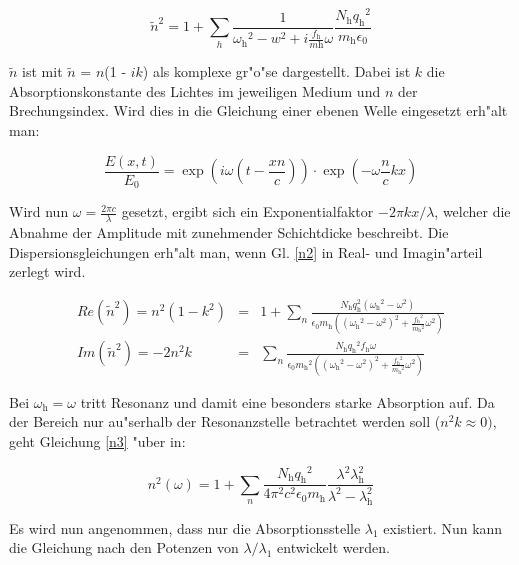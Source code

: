 	\begin{equation}
		\tilde{n}^2 = 1 + \sum_h \frac{1}{{\omega_\mathrm{h}}^2 - w^2 + i \frac{f_\mathrm{h}}{m\mathrm{h}} \omega} \frac{N_\mathrm{h} {q_\mathrm{h}}^2}{m_\mathrm{h} \epsilon_\mathrm{0}}  \label{n2}
	\end{equation}

	$\tilde{n}$ ist mit $\tilde{n}$ = $n$(1 - $ik$) als komplexe gr"o"se dargestellt. Dabei ist $k$ die Absorptionskonstante des Lichtes im jeweiligen Medium und $n$ der Brechungsindex.
	Wird dies in die Gleichung einer ebenen Welle eingesetzt erh"alt man: 

	\begin{equation}
		\frac{E(x,t)}{E_\mathrm{0}} = \exp{(i\omega(t- \frac{xn}{c}))} \cdot \exp{(-\omega \frac{n}{c} kx)} 
	\end{equation}
 
	Wird nun $\omega = \frac{2\pi c}{\lambda}$ gesetzt, ergibt sich ein Exponentialfaktor $-2\pi kx/\lambda$, welcher die Abnahme der Amplitude mit zunehmender Schichtdicke beschreibt. Die Dispersionsgleichungen erh"alt man, wenn Gl. \eqref{n2} in Real- und Imagin"arteil zerlegt wird. 

	\begin{eqnarray}
		Re(\tilde{n}^2) = n^2(1-k^2) &=& 1 + \sum_n \frac{N_\mathrm{h} {q_\mathrm{h}^2 ({\omega_\mathrm{h}}^2 -\omega^2)}}{\epsilon_\mathrm{0} m_\mathrm{h} \left( ( {\omega_\mathrm{h}}^2-\omega^2)^2 + \frac{{f_\mathrm{h}}^2}{{m_\mathrm{h}}^2} \omega^2 \right)}  \label{n3}\\
		Im(\tilde{n}^2) = -2n^2k &=& \sum_n \frac{N_\mathrm{h} {q_\mathrm{h}}^2 f_\mathrm{h} \omega}{\epsilon_\mathrm{0} {m_\mathrm{h}}^2 \left( ( {\omega_\mathrm{h}}^2-\omega^2)^2 + \frac{{f_\mathrm{h}}^2}{{m_\mathrm{h}}^2} \omega^2 \right)}  \nonumber
	\end{eqnarray}

	Bei $\omega_\mathrm{h} = \omega$ tritt Resonanz und damit eine besonders starke Absorption auf. Da der Bereich nur au"serhalb der Resonanzstelle betrachtet werden soll ($n^2k \approx 0)$, geht Gleichung \eqref{n3} "uber in:

	\begin{equation}
		n^2(\omega) = 1 + \sum_n \frac{N_\mathrm{h} {q_\mathrm{h}}^2}{4 \pi^2 c^2 \epsilon_\mathrm{0} m_\mathrm{h}} \frac{\lambda^2 \lambda_\mathrm{h}^2}{\lambda^2 - \lambda_\mathrm{h}^2} 
	\end{equation}

	Es wird nun angenommen, dass nur die Absorptionsstelle $\lambda_\mathrm{1}$ existiert. Nun kann die Gleichung nach den Potenzen von $\lambda/\lambda_\mathrm{1}$ entwickelt werden.


